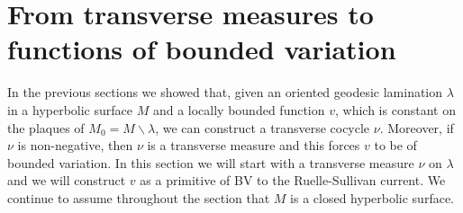 \documentclass{ip-journal}
\theoremstyle{definition}
\numberwithin{equation}{section}
\newcommand{\R}{\mathbb R}
\begin{document}
%

\section{From transverse measures to functions of bounded variation}\label{ruelles}
In the previous sections we showed that, given an oriented geodesic lamination $\lambda$ in a hyperbolic surface $M$ and  a locally bounded function $v$, which  is  constant on the plaques of $M_0=M \backslash \lambda$, we can construct a transverse cocycle $\nu$. Moreover, if $\nu$ is non-negative, then $\nu$ is a transverse measure and this forces $v$ to be of bounded variation. In this section we will start with a transverse measure $\nu$ on $\lambda$ and we will construct  $v$ as a primitive of BV to the Ruelle-Sullivan current. We continue to assume throughout the section that $M$ is a closed hyperbolic surface.
\end{document}
